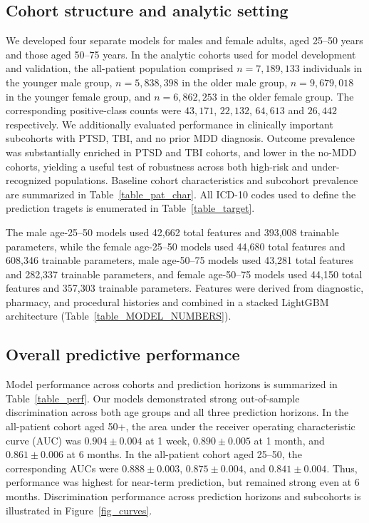 \documentclass[onecolumn, compsoc,11pt]{IEEEtran}
\begin{document}
\subsection*{Cohort structure and analytic setting}
We developed four separate models for males and female adults, aged 25--50 years and those aged 50--75 years. In the analytic cohorts used for model development and validation, the all-patient population comprised $n=7{,}189{,}133$ individuals in the younger male group, $n=5{,}838{,}398$ in the older male group, $n=9{,}679{,}018$ in the younger female group, and $n=6{,}862{,}253$ in the older female group. The corresponding positive-class counts were $43,171$, $22,132$, $64,613$ and $26,442$  respectively. 
We additionally evaluated performance in clinically important subcohorts with PTSD, TBI, and no prior MDD diagnosis. Outcome prevalence was substantially enriched in PTSD and TBI cohorts, and lower in the no-MDD cohorts, yielding a useful test of robustness across both high-risk and under-recognized populations. Baseline cohort characteristics and subcohort prevalence are summarized in Table~\ref{table_pat_char}.
All ICD-10 codes used to define the prediction tragets is enumerated in Table~\ref{table_target}.

The male age-25--50 models used 42,662 total features and 393,008 trainable parameters, while the female age-25--50 models used 44,680 total features and 608,346 trainable parameters, male age-50--75 models used 43,281 total features and 282,337 trainable parameters, and female age-50--75 models used 44,150 total features and 357,303 trainable parameters. Features were derived from diagnostic, pharmacy, and procedural histories and combined in a stacked LightGBM architecture (Table~\ref{table_MODEL_NUMBERS}).

\subsection*{Overall predictive performance}
Model performance across cohorts and prediction horizons is summarized in Table~\ref{table_perf}. Our models demonstrated strong out-of-sample discrimination across both age groups and all three prediction horizons. In the all-patient cohort aged 50+, the area under the receiver operating characteristic curve (AUC) was $0.904 \pm 0.004$ at 1 week, $0.890 \pm 0.005$ at 1 month, and $0.861 \pm 0.006$ at 6 months. In the all-patient cohort aged 25--50, the corresponding AUCs were $0.888 \pm 0.003$, $0.875 \pm 0.004$, and $0.841 \pm 0.004$. Thus, performance was highest for near-term prediction, but remained strong even at 6 months.
Discrimination performance across prediction horizons and subcohorts is illustrated in Figure~\ref{fig_curves}.
\end{document}
